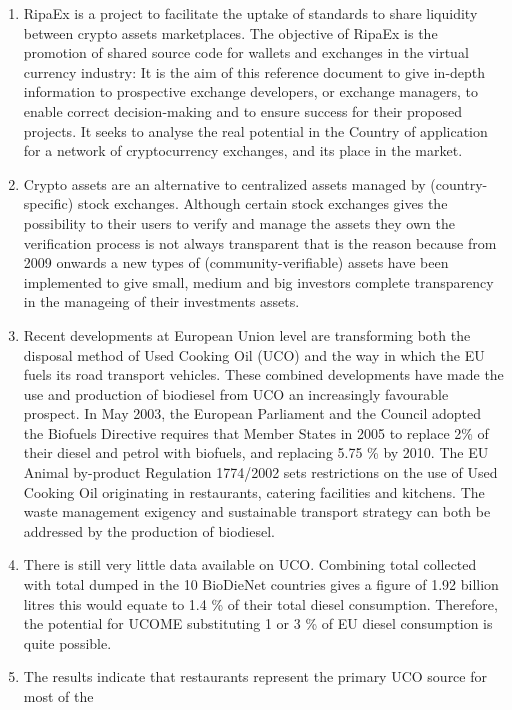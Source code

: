 \documentclass[11pt,fleqn,oneside]{book} %
\begin{document}
\begin{enumerate}
	\item RipaEx is a project to facilitate the uptake of standards to share liquidity between crypto assets marketplaces. 
	The objective of RipaEx is the promotion of shared source code for wallets and exchanges in the virtual currency industry: 
	It is the aim of this reference document to give in-depth information to prospective exchange developers,
	or exchange managers, to enable correct decision-making and to ensure success for their proposed projects. 
	It seeks to analyse the real potential in the Country of application for a network of cryptocurrency exchanges, 
	and its place in the market.
	\item Crypto assets are an alternative to centralized assets managed by (country-specific) stock exchanges. Although certain
	stock exchanges gives the possibility to their users to verify and manage the assets they own the verification process
	is not always transparent that is the reason because from 2009 \cite{bitcoin} onwards a new types of (community-verifiable) assets 
	have been implemented to give small, medium and big investors complete transparency in the manageing of their investments
	assets.
	\item Recent developments at European Union level are transforming both the disposal
	method of Used Cooking Oil (UCO) and the way in which the EU fuels its road transport
	vehicles. These combined developments have made the use and production of biodiesel
	from UCO an increasingly favourable prospect. In May 2003, the European Parliament
	and the Council adopted the Biofuels Directive requires that Member States in 2005 to
	replace 2\% of their diesel and petrol with biofuels, and replacing 5.75 \% by 2010. The EU
	Animal by-product Regulation 1774/2002 sets restrictions on the use of Used Cooking Oil
	originating in restaurants, catering facilities and kitchens. The waste management
	exigency and sustainable transport strategy can both be addressed by the production of
	biodiesel.
	\item There is still very little data available on UCO. Combining total collected with total
	dumped in the 10 BioDieNet countries gives a figure of 1.92 billion litres this would
	equate to 1.4 \% of their total diesel consumption. Therefore, the potential for UCOME
	substituting 1 or 3 \% of EU diesel consumption is quite possible.
	\item The results indicate that restaurants represent the primary UCO source for most of the

\end{enumerate}
\end{document}
